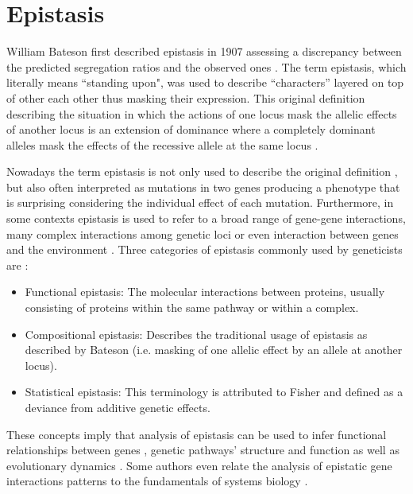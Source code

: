 \section{Epistasis \label{sec:epi}}

William Bateson first described epistasis in 1907 \cite{tyler2009shadows} assessing a discrepancy between the predicted segregation ratios and the observed ones \cite{phillips2008epistasis}.
The term epistasis, which literally means ``standing upon", was used to describe ``characters'' layered on top of other each other thus masking their expression.
This original definition describing the situation in which the actions of one locus mask the allelic effects of another locus is an extension of dominance where a completely dominant alleles mask the effects of the recessive allele at the same locus \cite{carlborg2004epistasis, cordell2002epistasis}.

Nowadays the term epistasis is not only used to describe the original definition \cite{cordell2002epistasis}, but also often interpreted as mutations in two genes producing a phenotype that is surprising considering the individual effect of each mutation.
Furthermore, in some contexts epistasis is used to refer to a broad range of gene-gene interactions, many complex interactions among genetic loci or even interaction between genes and the environment \cite{phillips2008epistasis}.
Three categories of epistasis commonly used by geneticists are \cite{phillips2008epistasis, zhao2006test}: 

\begin{itemize}
	\item Functional epistasis: The molecular interactions between proteins, usually consisting of proteins within the same pathway or within a complex.
	\item Compositional epistasis: Describes the traditional usage of epistasis as described by Bateson (i.e. masking of one allelic effect by an allele at another locus).
	\item Statistical epistasis: This terminology is attributed to Fisher and defined as a deviance from additive genetic effects.
\end{itemize}

These concepts imply that analysis of epistasis can be used to infer functional relationships between genes \cite{mani2008defining}, genetic pathways' structure and function as well as evolutionary dynamics \cite{phillips2008epistasis}. 
Some authors even relate the analysis of epistatic gene interactions patterns to the fundamentals of systems biology \cite{phillips2008epistasis}.

